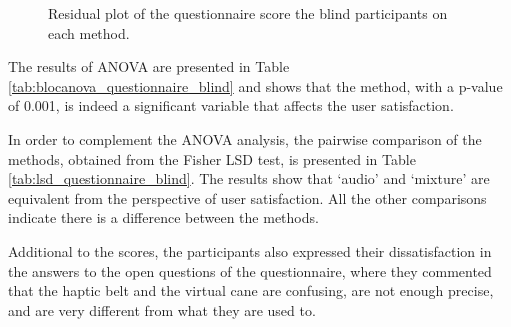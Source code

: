 \begin{figure}[!thb]
\begin{minipage}{0.45\textwidth}
        \caption{Residual plot of the questionnaire score the blind participants on each method.}
        \label{fig:residplot_questionnaires_blind}
    \end{minipage}
\end{figure}

The results of ANOVA are presented in Table  \ref{tab:blocanova_questionnaire_blind} and shows that the method, with a p-value of 0.001, is indeed a significant variable that affects the user satisfaction.



In order to complement the ANOVA analysis, the pairwise comparison of the methods, obtained from the Fisher LSD test, is presented in Table \ref{tab:lsd_questionnaire_blind}. The results show that ‘audio’ and ‘mixture’ are equivalent from the perspective of user satisfaction. All the other comparisons indicate there is a difference between the methods.



Additional to the scores, the participants also expressed their dissatisfaction in the answers to the open questions of the questionnaire, where they commented that the haptic belt and the virtual cane are confusing, are not enough precise, and are very different from what they are used to.

\FloatBarrier